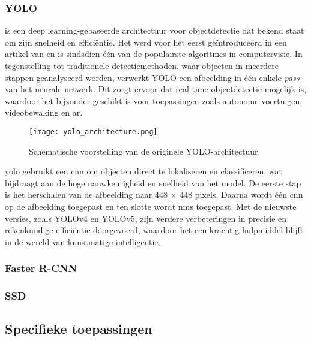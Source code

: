 \subsubsection{YOLO}

 is een deep learning-gebaseerde architectuur voor objectdetectie dat bekend staat om zijn snelheid en efficiëntie. Het werd voor het eerst geïntroduceerd in een artikel van \textcite{Redmon_2016} en is sindsdien één van de populairste algoritmes in computervisie. In tegenstelling tot traditionele detectiemethoden, waar objecten in meerdere stappen geanalyseerd worden, verwerkt YOLO een afbeelding in één enkele \emph{pass} van het neurale netwerk. Dit zorgt ervoor dat real-time objectdetectie mogelijk is, waardoor het bijzonder geschikt is voor toepassingen zoals autonome voertuigen, videobewaking en \gls{ar}.

\begin{figure}[H]
    \centering
    \texttt{[image: yolo\_architecture.png]}
    \caption[Originele YOLO-architectuur.]{\label{fig:yolo_architecture}Schematische voorstelling van de originele YOLO-architectuur. \autocite{Redmon_2016}}
\end{figure}

\gls{yolo} gebruikt een \gls{cnn} om objecten direct te lokaliseren en classificeren, wat bijdraagt aan de hoge nauwkeurigheid en snelheid van het model. De eerste stap is het herschalen van de afbeelding naar 448 $\times$ 448 pixels. Daarna wordt één \gls{cnn} op de afbeelding toegepast en ten slotte wordt \gls{nms} toegepast. Met de nieuwste versies, zoals YOLOv4 en YOLOv5, zijn verdere verbeteringen in precisie en rekenkundige efficiëntie doorgevoerd, waardoor het een krachtig hulpmiddel blijft in de wereld van kunstmatige intelligentie.

\subsubsection{Faster R-CNN}

\lipsum[1]

\subsubsection{SSD}

\lipsum[1]

\subsection{Specifieke toepassingen}

\lipsum[1-3]
